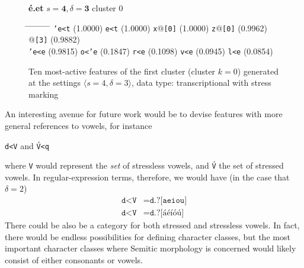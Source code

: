 \begin{figure}[t] 
\begin{mdframed}
{\LARGE\textbf{\'{e}.et}} \large{\hfill $s=\textbf{4},\delta=\textbf{3}$} \hfill cluster 0
\vspace{3pt}
\begin{small}
\begin{tabbing}
\hspace{6ex} \= \hspace{10.5ex} \= \hspace{6ex} \= \hspace{10.5ex} \= \hspace{6ex} \= \hspace{11ex} \= \hspace{7ex} \= \hspace{11ex} \= \hspace{7ex} \= \hspace{10ex} \kill
\texttt{\a'{e}<t} \> (1.0000) \> \texttt{e<t} \> (1.0000) \> \texttt{x}@\texttt{[0]} \> (1.0000) \> \texttt{z}@\texttt{[0]} \> (0.9962) \> \texttt{}@\texttt{[3]} \> (0.9882) \\
 \texttt{\a'{e}<e} \> (0.9815) \> \texttt{o<\a'{e}} \> (0.1847) \> \texttt{r<e} \> (0.1098) \> \texttt{v<e} \> (0.0945) \> \texttt{l<e} \> (0.0854)
\end{tabbing}
\end{small}
\caption{Ten most-active features of the first cluster (cluster $k = 0$) generated at the settings $\langle{s}=4,\delta=3\rangle$, data type: transcriptional with stress marking}
\label{fig:cluster-0-4-3-TS}
\end{mdframed}
\end{figure}


An interesting avenue for future work would be to devise features with more general references to vowels, for instance 
\begin{center}\texttt{d<V} and \texttt{\'{V}<q}\end{center}
 where 
 \texttt{V} would represent the \emph{set} of stressless vowels, and \texttt{\'{V}} the set of stressed vowels. In regular-expression terms, therefore, we would have (in the case that $\delta = 2$)
 \begin{align}
 \texttt{d<V} &= \texttt{d.?[aeiou]} \\
  \texttt{d<\'{V}} &= \texttt{d.?[\'{a}\'{e}\'{i}\'{o}\'{u}]}
 \end{align}
 There could be also be a category for both stressed and stressless vowels. In fact, there would be endless possibilities for defining character classes, but the most important character classes where Semitic morphology is concerned would likely consist of either consonants or vowels. 
 
